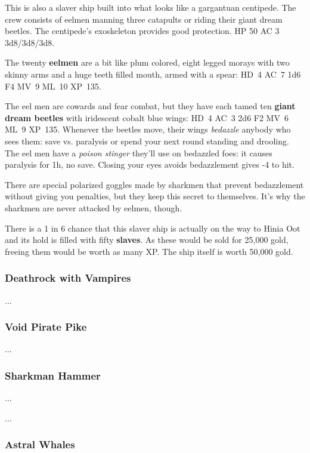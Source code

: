 \documentclass[11pt]{bxart}
\begin{document}
This is also a slaver ship built into what looks like a gargantuan centipede. The crew consists of eelmen manning three catapults or riding their giant dream beetles. The centipede's exoskeleton provides good protection. HP 50 AC 3 3d8/3d8/3d8.

The twenty \textbf{eelmen} are a bit like plum colored, eight legged morays with two skinny arms and a huge teeth filled mouth, armed with a spear: HD~4 AC~7 1d6 F4 MV~9 ML~10 XP~135.

The eel men are cowards and fear combat, but they have each tamed ten \textbf{giant dream beetles} with iridescent cobalt blue wings: HD~4 AC~3 2d6 F2 MV~6 ML~9 XP~135. Whenever the beetles move, their wings \textit{bedazzle} anybody who sees them: save vs. paralysis or spend your next round standing and drooling. The eel men have a \textit{poison stinger} they'll use on bedazzled foes: it causes paralysis for 1h, no save. Closing your eyes avoids bedazzlement gives -4 to hit.

There are special polarized goggles made by sharkmen that prevent bedazzlement without giving you penalties, but they keep this secret to themselves. It's why the sharkmen are never attacked by eelmen, though.

There is a 1 in 6 chance that this slaver ship is actually on the way to Hinia Oot and its hold is filled with fifty \textbf{slaves}. As these would be sold for 25,000 gold, freeing them would be worth as many XP. The ship itself is worth 50,000 gold.

\subsubsection{Deathrock with Vampires}

...

\subsubsection{Void Pirate Pike}

...

\subsubsection{Sharkman Hammer}

...

\newpage

...

\newpage

\subsubsection{Astral Whales}
\end{document}
